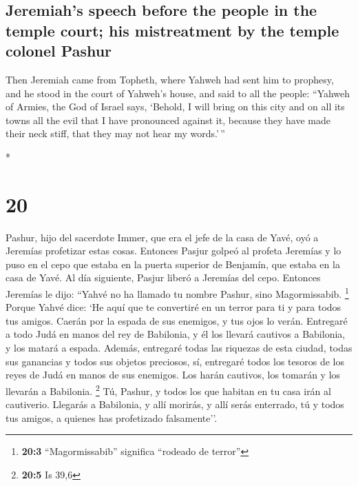 \begin{paracol}{2}
\begin{otherlanguage}{english}
\hypertarget{jeremiahs-speech-before-the-people-in-the-temple-court-his-mistreatment-by-the-temple-colonel-pashur}{%
\subsection{Jeremiah's speech before the people in the temple court; his
mistreatment by the temple colonel
Pashur}\label{jeremiahs-speech-before-the-people-in-the-temple-court-his-mistreatment-by-the-temple-colonel-pashur}}

 Then Jeremiah came from Topheth, where Yahweh had sent
him to prophesy, and he stood in the court of Yahweh's house, and said
to all the people:  ``Yahweh of Armies, the God of Israel
says, `Behold, I will bring on this city and on all its towns all the
evil that I have pronounced against it, because they have made their
neck stiff, that they may not hear my words.'\,''

\end{otherlanguage}

\switchcolumn[0]*

\hypertarget{section-38}{%
\section{20}\label{section-38}}

 Pashur, hijo del sacerdote Immer, que era el jefe de la
casa de Yavé, oyó a Jeremías profetizar estas cosas. 
Entonces Pasjur golpeó al profeta Jeremías y lo puso en el cepo que
estaba en la puerta superior de Benjamín, que estaba en la casa de Yavé.
 Al día siguiente, Pasjur liberó a Jeremías del cepo.
Entonces Jeremías le dijo: ``Yahvé no ha llamado tu nombre Pashur, sino
Magormissabib. \footnote{\textbf{20:3} ``Magormissabib'' significa
  ``rodeado de terror''}  Porque Yahvé dice: `He aquí que
te convertiré en un terror para ti y para todos tus amigos. Caerán por
la espada de sus enemigos, y tus ojos lo verán. Entregaré a todo Judá en
manos del rey de Babilonia, y él los llevará cautivos a Babilonia, y los
matará a espada.  Además, entregaré todas las riquezas de
esta ciudad, todas sus ganancias y todos sus objetos preciosos, sí,
entregaré todos los tesoros de los reyes de Judá en manos de sus
enemigos. Los harán cautivos, los tomarán y los llevarán a Babilonia.
\footnote{\textbf{20:5} Is 39,6}  Tú, Pashur, y todos los
que habitan en tu casa irán al cautiverio. Llegarás a Babilonia, y allí
morirás, y allí serás enterrado, tú y todos tus amigos, a quienes has
profetizado falsamente''.


\end{paracol}
